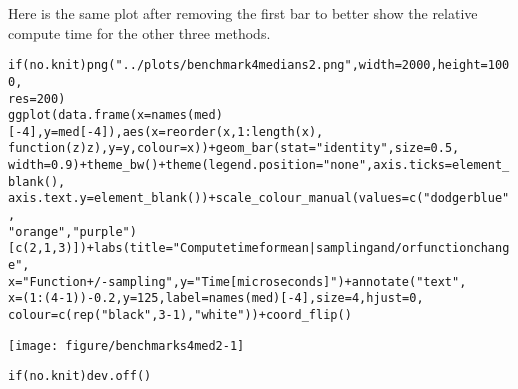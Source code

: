 \documentclass{article}\usepackage[]{graphicx}\usepackage[]{color}
\makeatletter
\def\maxwidth{ %
  \ifdim\Gin@nat@width>\linewidth
    \linewidth
  \else
    \Gin@nat@width
  \fi
}
\newcommand{\hlnum}[1]{\textcolor[rgb]{0.863,0.196,0.184}{#1}}%
\newcommand{\hlstr}[1]{\textcolor[rgb]{0.863,0.196,0.184}{#1}}%
\newcommand{\hlopt}[1]{\textcolor[rgb]{0.576,0.631,0.631}{#1}}%
\newcommand{\hlstd}[1]{\textcolor[rgb]{0.514,0.58,0.588}{#1}}%
\newcommand{\hlkwa}[1]{\textcolor[rgb]{0.796,0.294,0.086}{#1}}%
\newcommand{\hlkwc}[1]{\textcolor[rgb]{0.796,0.294,0.086}{#1}}%
\newcommand{\hlkwd}[1]{\textcolor[rgb]{0.576,0.631,0.631}{#1}}%
\newenvironment{kframe}{%
 \def\at@end@of@kframe{}%
 \ifinner\ifhmode%
  \def\at@end@of@kframe{\end{minipage}}%
  \begin{minipage}{\columnwidth}%
 \fi\fi%
 \def\FrameCommand##1{\hskip\@totalleftmargin \hskip-\fboxsep
 \colorbox{shadecolor}{##1}\hskip-\fboxsep
     \hskip-\linewidth \hskip-\@totalleftmargin \hskip\columnwidth}%
 \MakeFramed {\advance\hsize-\width
   \@totalleftmargin\z@ \linewidth\hsize
   \@setminipage}}%
 {\par\unskip\endMakeFramed%
 \at@end@of@kframe}
\newenvironment{knitrout}{}{} %
\makeatother
\begin{document}
Here is the same plot after removing the first bar to better show the relative compute time for the other three methods.

\begin{knitrout}
\color{fgcolor}\begin{kframe}
\begin{alltt}
\hlkwa{if} \hlstd{(no.knit)} \hlkwd{png}\hlstd{(}\hlstr{"../plots/benchmark4medians2.png"}\hlstd{,} \hlkwc{width} \hlstd{=} \hlnum{2000}\hlstd{,} \hlkwc{height} \hlstd{=} \hlnum{1000}\hlstd{,}
    \hlkwc{res} \hlstd{=} \hlnum{200}\hlstd{)}
\hlkwd{ggplot}\hlstd{(}\hlkwd{data.frame}\hlstd{(}\hlkwc{x} \hlstd{=} \hlkwd{names}\hlstd{(med)[}\hlopt{-}\hlnum{4}\hlstd{],} \hlkwc{y} \hlstd{= med[}\hlopt{-}\hlnum{4}\hlstd{]),} \hlkwd{aes}\hlstd{(}\hlkwc{x} \hlstd{=} \hlkwd{reorder}\hlstd{(x,} \hlnum{1}\hlopt{:}\hlkwd{length}\hlstd{(x),}
    \hlkwa{function}\hlstd{(}\hlkwc{z}\hlstd{) z),} \hlkwc{y} \hlstd{= y,} \hlkwc{colour} \hlstd{= x))} \hlopt{+} \hlkwd{geom_bar}\hlstd{(}\hlkwc{stat} \hlstd{=} \hlstr{"identity"}\hlstd{,} \hlkwc{size} \hlstd{=} \hlnum{0.5}\hlstd{,}
    \hlkwc{width} \hlstd{=} \hlnum{0.9}\hlstd{)} \hlopt{+} \hlkwd{theme_bw}\hlstd{()} \hlopt{+} \hlkwd{theme}\hlstd{(}\hlkwc{legend.position} \hlstd{=} \hlstr{"none"}\hlstd{,} \hlkwc{axis.ticks} \hlstd{=} \hlkwd{element_blank}\hlstd{(),}
    \hlkwc{axis.text.y} \hlstd{=} \hlkwd{element_blank}\hlstd{())} \hlopt{+} \hlkwd{scale_colour_manual}\hlstd{(}\hlkwc{values} \hlstd{=} \hlkwd{c}\hlstd{(}\hlstr{"dodgerblue"}\hlstd{,}
    \hlstr{"orange"}\hlstd{,} \hlstr{"purple"}\hlstd{)[}\hlkwd{c}\hlstd{(}\hlnum{2}\hlstd{,} \hlnum{1}\hlstd{,} \hlnum{3}\hlstd{)])} \hlopt{+} \hlkwd{labs}\hlstd{(}\hlkwc{title} \hlstd{=} \hlstr{"Compute time for mean | sampling and/or function change"}\hlstd{,}
    \hlkwc{x} \hlstd{=} \hlstr{"Function +/- sampling"}\hlstd{,} \hlkwc{y} \hlstd{=} \hlstr{"Time [microseconds]"}\hlstd{)} \hlopt{+} \hlkwd{annotate}\hlstd{(}\hlstr{"text"}\hlstd{,}
    \hlkwc{x} \hlstd{= (}\hlnum{1}\hlopt{:}\hlstd{(}\hlnum{4} \hlopt{-} \hlnum{1}\hlstd{))} \hlopt{-} \hlnum{0.2}\hlstd{,} \hlkwc{y} \hlstd{=} \hlnum{125}\hlstd{,} \hlkwc{label} \hlstd{=} \hlkwd{names}\hlstd{(med)[}\hlopt{-}\hlnum{4}\hlstd{],} \hlkwc{size} \hlstd{=} \hlnum{4}\hlstd{,} \hlkwc{hjust} \hlstd{=} \hlnum{0}\hlstd{,}
    \hlkwc{colour} \hlstd{=} \hlkwd{c}\hlstd{(}\hlkwd{rep}\hlstd{(}\hlstr{"black"}\hlstd{,} \hlnum{3} \hlopt{-} \hlnum{1}\hlstd{),} \hlstr{"white"}\hlstd{))} \hlopt{+} \hlkwd{coord_flip}\hlstd{()}
\end{alltt}
\end{kframe}
\texttt{[image: figure/benchmarks4med2-1]} 
\begin{kframe}\begin{alltt}
\hlkwa{if} \hlstd{(no.knit)} \hlkwd{dev.off}\hlstd{()}
\end{alltt}
\end{kframe}
\end{knitrout}
\end{document}
